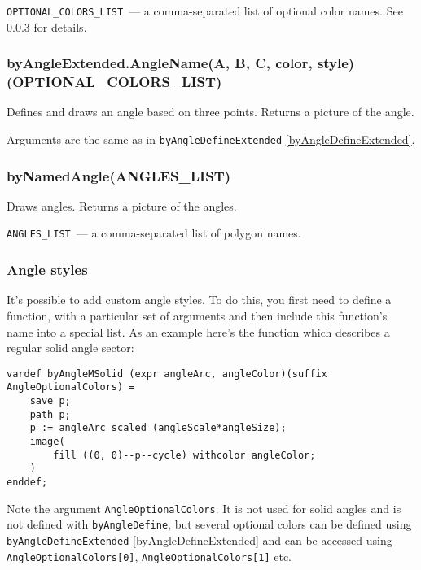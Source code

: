 	\texttt{OPTIONAL\_COLORS\_LIST}~— a comma-separated list of optional color names. See \ref{AngleStyles} for details.
	
\subsubsection{byAngleExtended.AngleName(A, B, C, color, style)(OPTION\-AL\_COLORS\_LIST)}\label{byAngleExtended}

	Defines and draws an angle based on three points. Returns a picture of the angle.
	
	Arguments are the same as in \texttt{byAngleDefineExtended} \ref{byAngleDefineExtended}.

\subsubsection{byNamedAngle(ANGLES\_LIST)}\label{byNamedAngle}
	
	Draws angles. Returns a picture of the angles.
	
	\texttt{ANGLES\_LIST}~— a comma-separated list of polygon names.


\subsubsection{Angle styles}\label{AngleStyles}

	It's possible to add custom angle styles. To do this, you first need to define a function, with a particular set of arguments and then include this function's name into a special list. As an example here's the function which describes a regular solid angle sector:
	
\begin{lstlisting}
vardef byAngleMSolid (expr angleArc, angleColor)(suffix AngleOptionalColors) =
    save p;
    path p;
    p := angleArc scaled (angleScale*angleSize);
    image(
        fill ((0, 0)--p--cycle) withcolor angleColor;
    )
enddef;
\end{lstlisting}

	Note the argument \texttt{AngleOptionalColors}. It is not used for solid angles and is not defined with \texttt{byAngleDefine}, but several optional colors can be defined using \texttt{byAngleDefineExtended} \ref{byAngleDefineExtended} and can be accessed using \texttt{AngleOptionalColors[0]}, \texttt{AngleOptionalColors[1]} etc.

